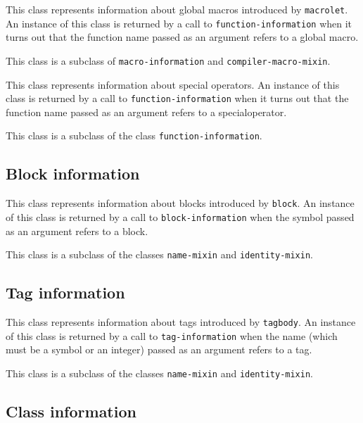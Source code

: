 
This class represents information about global macros introduced by
\texttt{macrolet}.  An instance of this class is returned by a call to
\texttt{function-information} when it turns out that the function name passed
as an argument refers to a global macro.

This class is a subclass of \texttt{macro-information} and \texttt{compiler-macro-mixin}.


This class represents information about special operators.  An
instance of this class is returned by a call to \texttt{function-information}
when it turns out that the function name passed as an argument refers
to a specialoperator.

This class is a subclass of the class \texttt{function-information}.

\subsection{Block information}


This class represents information about blocks introduced by
\texttt{block}.  An instance of this class is returned by a call to
\texttt{block-information} when the symbol passed as an argument refers to a
block.

This class is a subclass of the classes \texttt{name-mixin} and
\texttt{identity-mixin}.

\subsection{Tag information}


This class represents information about tags introduced by
\texttt{tagbody}.  An instance of this class is returned by a call to
\texttt{tag-information} when the name (which must be a symbol or an integer)
passed as an argument refers to a tag.

This class is a subclass of the classes \texttt{name-mixin} and
\texttt{identity-mixin}.

\subsection{Class information}

